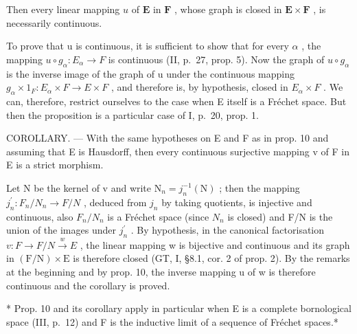Then every linear mapping \(u\) of \(\mathbf{E}\) in \(\mathbf{F}\) , whose graph is closed in \(\mathbf{E} \times \mathbf{F}\) , is necessarily continuous.

To prove that u is continuous, it is sufficient to show that for every \(\alpha\) , the mapping \(u \circ g_{\alpha}: E_{\alpha} \to F\) is continuous (II, p.~27, prop. 5). Now the graph of \(u \circ g_{\alpha}\) is the inverse image of the graph of u under the continuous mapping \(g_{\alpha} \times 1_{F}: E_{\alpha} \times F \to E \times F\) , and therefore is, by hypothesis, closed in \(E_{\alpha} \times F\) . We can, therefore, restrict ourselves to the case when E itself is a Fréchet space. But then the proposition is a particular case of I, p.~20, prop. 1.

COROLLARY. --- With the same hypotheses on E and F as in prop. 10 and assuming that E is Hausdorff, then every continuous surjective mapping v of F in E is a strict morphism.

Let N be the kernel of v and write \(\mathrm{N}_{n}=j_{n}^{-1}(\mathrm{N})\) ; then the mapping \(j_{n}^{\prime}:F_{n}/N_{n}\to F/N\) , deduced from \(j_{n}\) by taking quotients, is injective and continuous, also \(F_{n}/N_{n}\) is a Fréchet space (since \(N_{n}\) is closed) and F/N is the union of the images under \(j_{n}^{\prime}\) . By hypothesis, in the canonical factorisation \(v:F\to F/N\stackrel{w}{\to}E\) , the linear mapping w is bijective and continuous and its graph in \((\mathrm{F/N})\times\mathrm{E}\) is therefore closed (GT, I, §8.1, cor. 2 of prop. 2). By the remarks at the beginning and by prop. 10, the inverse mapping u of w is therefore continuous and the corollary is proved.

* Prop. 10 and its corollary apply in particular when E is a complete bornological space (III, p.~12) and F is the inductive limit of a sequence of Fréchet spaces.*

